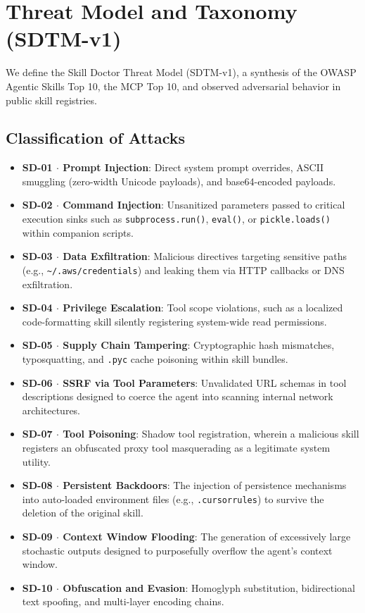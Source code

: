 \documentclass[11pt,a4paper]{article}
\begin{document}
\section{Threat Model and Taxonomy (SDTM-v1)}

We define the Skill Doctor Threat Model (SDTM-v1), a synthesis of the OWASP Agentic Skills Top 10, the MCP Top 10, and observed adversarial behavior in public skill registries.

\subsection{Classification of Attacks}

\begin{itemize}
    \item \textbf{SD-01 $\cdot$ Prompt Injection}: Direct system prompt overrides, ASCII smuggling (zero-width Unicode payloads), and base64-encoded payloads.
    \item \textbf{SD-02 $\cdot$ Command Injection}: Unsanitized parameters passed to critical execution sinks such as \texttt{subprocess.run()}, \texttt{eval()}, or \texttt{pickle.loads()} within companion scripts.
    \item \textbf{SD-03 $\cdot$ Data Exfiltration}: Malicious directives targeting sensitive paths (e.g., \texttt{\textasciitilde/.aws/credentials}) and leaking them via HTTP callbacks or DNS exfiltration.
    \item \textbf{SD-04 $\cdot$ Privilege Escalation}: Tool scope violations, such as a localized code-formatting skill silently registering system-wide read permissions.
    \item \textbf{SD-05 $\cdot$ Supply Chain Tampering}: Cryptographic hash mismatches, typosquatting, and \texttt{.pyc} cache poisoning within skill bundles.
    \item \textbf{SD-06 $\cdot$ SSRF via Tool Parameters}: Unvalidated URL schemas in tool descriptions designed to coerce the agent into scanning internal network architectures.
    \item \textbf{SD-07 $\cdot$ Tool Poisoning}: Shadow tool registration, wherein a malicious skill registers an obfuscated proxy tool masquerading as a legitimate system utility.
    \item \textbf{SD-08 $\cdot$ Persistent Backdoors}: The injection of persistence mechanisms into auto-loaded environment files (e.g., \texttt{.cursorrules}) to survive the deletion of the original skill.
    \item \textbf{SD-09 $\cdot$ Context Window Flooding}: The generation of excessively large stochastic outputs designed to purposefully overflow the agent's context window.
    \item \textbf{SD-10 $\cdot$ Obfuscation and Evasion}: Homoglyph substitution, bidirectional text spoofing, and multi-layer encoding chains.
\end{itemize}
\end{document}
